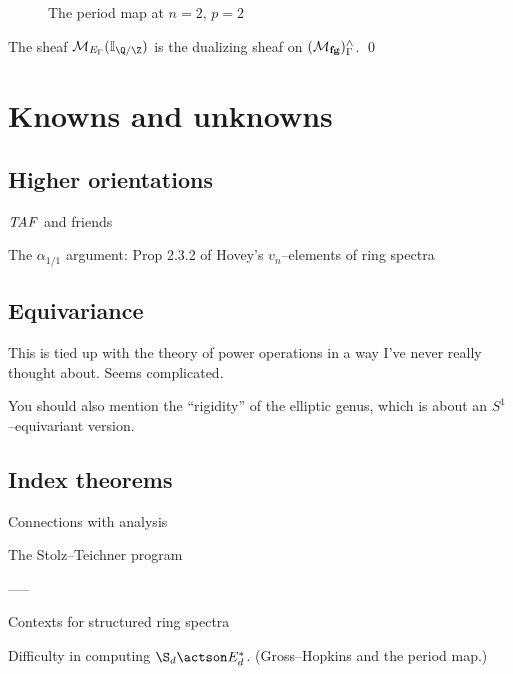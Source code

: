 \begin{figure}
\caption{The period map at $n = 2$, $p = 2$}
\end{figure}

\begin{theorem}
The sheaf $\context{E_\Gamma}(\mathbb I_{\Q/\Z})$ is the dualizing sheaf on $(\mathcal{M}_{\mathbf{fg}})^\wedge_\Gamma$. \qed
\end{theorem}





\section{Knowns and unknowns}



\subsection*{Higher orientations}

$\mathit{TAF}$ and friends\label{TAFDiscussion}

The $\alpha_{1/1}$ argument: Prop 2.3.2 of Hovey's $v_n$--elements of ring spectra


\subsection*{Equivariance}

This is tied up with the theory of power operations in a way I've never really thought about.  Seems complicated.

You should also mention the ``rigidity'' of the elliptic genus, which is about an $S^1$--equivariant version.

\subsection*{Index theorems}

Connections with analysis

The Stolz--Teichner program








-----

Contexts for structured ring spectra

Difficulty in computing $\S_d \actson E_d^*$. (Gross--Hopkins and the period map.)

